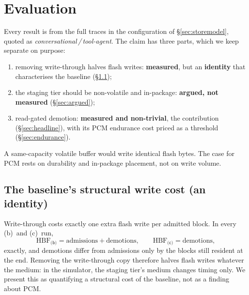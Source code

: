 \documentclass[conference]{IEEEtran}
\newcommand{\cfgb}{\textsf{(b)}}
\newcommand{\cfgc}{\textsf{(c)}}
\begin{document}
\section{Evaluation}\label{sec:eval}
Every result is from the full traces in the configuration of
\S\ref{sec:storemodel}, quoted as \emph{conversational\,/\,tool-agent}. The
claim has three parts, which we keep separate on purpose:
\begin{enumerate}
  \item removing write-through halves flash writes: \textbf{measured}, but an
        \textbf{identity} that characterises the baseline (\S\ref{sec:identity});
  \item the staging tier should be non-volatile and in-package:
        \textbf{argued, not measured} (\S\ref{sec:argued});
  \item read-gated demotion: \textbf{measured and non-trivial}, the
        contribution (\S\ref{sec:headline}), with its PCM endurance cost priced
        as a threshold (\S\ref{sec:endurance}).
\end{enumerate}
A same-capacity volatile buffer would write identical flash bytes. The case for
PCM rests on durability and in-package placement, not on write volume.

\subsection{The baseline's structural write cost (an identity)}\label{sec:identity}
Write-through costs exactly one extra flash write per admitted block. In every
\cfgb\ and \cfgc\ run,
\begin{equation}
\text{HBF}_{\cfgb} = \text{admissions} + \text{demotions},\qquad
\text{HBF}_{\cfgc} = \text{demotions},
\end{equation}
exactly, and demotions differ from admissions only by the blocks still resident
at the end. Removing the write-through copy therefore halves flash writes
whatever the medium: in the simulator, the staging tier's medium changes timing
only. We present this as quantifying a structural cost of the baseline, not as
a finding about PCM.
\end{document}
